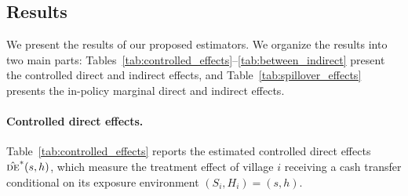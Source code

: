 \documentclass{article}
\newcommand{\de}{\textsc{de}}
\begin{document}
\subsection{Results}

We present the results of our proposed estimators. We organize the results into two main parts: Tables~\ref{tab:controlled_effects}--\ref{tab:between_indirect} present the controlled direct and indirect effects, and Table~\ref{tab:spillover_effects} presents the in-policy marginal direct and indirect effects.

\paragraph{Controlled direct effects.}
Table~\ref{tab:controlled_effects} reports the estimated controlled direct effects $\hat{\de}^{*}(s,h)$, which measure the treatment effect of village $i$ receiving a cash transfer conditional on its exposure environment $(S_i, H_i) = (s,h)$. 
\end{document}
